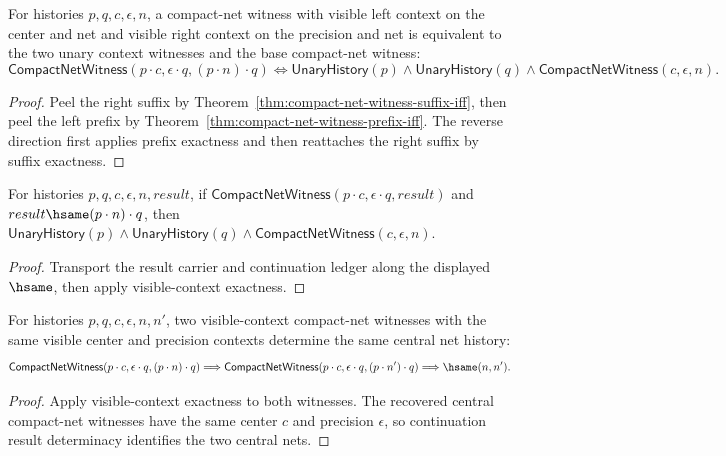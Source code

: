 \begin{theorem}
\label{thm:compact-net-witness-visible-context-iff}
For histories $p,q,c,\epsilon,n$, a compact-net witness with visible left
context on the center and net and visible right context on the precision and
net is equivalent to the two unary context witnesses and the base compact-net
witness:
$$
\mathsf{CompactNetWitness}(p\cdot c,\epsilon\cdot q,(p\cdot n)\cdot q)
\Longleftrightarrow
\mathsf{UnaryHistory}(p)\wedge
\mathsf{UnaryHistory}(q)\wedge
\mathsf{CompactNetWitness}(c,\epsilon,n).
$$
\end{theorem}
\begin{proof}
Peel the right suffix by Theorem~\ref{thm:compact-net-witness-suffix-iff}, then
peel the left prefix by Theorem~\ref{thm:compact-net-witness-prefix-iff}. The
reverse direction first applies prefix exactness and then reattaches the right
suffix by suffix exactness.
\end{proof}
\begin{theorem}\label{thm:compact-net-witness-visible-result-context-factorizes}
For histories $p,q,c,\epsilon,n,result$, if
$\mathsf{CompactNetWitness}(p\cdot c,\epsilon\cdot q,result)$ and
$result\hsame(p\cdot n)\cdot q$, then
$\mathsf{UnaryHistory}(p)\wedge\mathsf{UnaryHistory}(q)\wedge\mathsf{CompactNetWitness}(c,\epsilon,n)$.
\end{theorem}
\begin{proof}
Transport the result carrier and continuation ledger along the displayed $\hsame$, then apply visible-context exactness.
\end{proof}
\begin{theorem}
\label{thm:compact-net-witness-visible-context-result-deterministic}
For histories $p,q,c,\epsilon,n,n'$, two visible-context compact-net witnesses
with the same visible center and precision contexts determine the same central
net history:
$$
\mathsf{CompactNetWitness}(p\cdot c,\epsilon\cdot q,(p\cdot n)\cdot q)
\Longrightarrow
\mathsf{CompactNetWitness}(p\cdot c,\epsilon\cdot q,(p\cdot n')\cdot q)
\Longrightarrow
\hsame(n,n').
$$
\end{theorem}
\begin{proof}
Apply visible-context exactness to both witnesses. The recovered central
compact-net witnesses have the same center $c$ and precision $\epsilon$, so
continuation result determinacy identifies the two central nets.
\end{proof}

